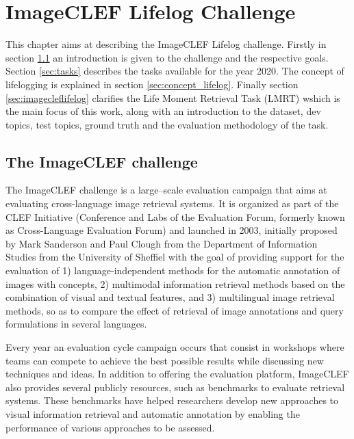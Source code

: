 \cleardoublepage

\chapter{ImageCLEF Lifelog Challenge}
\label{ch:imageclef}

This chapter aims at describing the ImageCLEF Lifelog challenge. Firstly in section \ref{sec:introduct} an introduction is given to the challenge and the respective goals. Section \ref{sec:tasks} describes the tasks available for the year 2020. The concept of lifelogging is explained in section \ref{sec:concept_lifelog}. Finally section \ref{sec:imagecleflifelog} clarifies the Life Moment Retrieval Task (LMRT) wshich is the main focus of this work, along with an introduction to the dataset, dev topics, test topics, ground truth and the evaluation methodology of the task.



\section{The ImageCLEF challenge}
\label{sec:introduct}

The ImageCLEF challenge is a large–scale evaluation campaign that aims at evaluating cross-language image retrieval systems. It is organized as part of the CLEF Initiative (Conference and Labs of the Evaluation Forum, formerly known as Cross-Language Evaluation Forum) and launched in  2003, initially proposed by Mark Sanderson and Paul Clough from the Department of Information Studies from the University of Sheffiel with the goal of providing support for the evaluation of 1) language-independent methods for the automatic annotation of images with concepts, 2) multimodal information retrieval methods based on the combination of visual and textual features, and 3) multilingual image retrieval methods, so as to compare the effect of retrieval of image annotations and query formulations in several languages.


Every year an evaluation cycle campaign occurs that consist in workshops where teams can compete to achieve the best possible results while discussing new techniques and ideas. In addition to offering the evaluation platform, ImageCLEF also provides several publicly resources, such as benchmarks to evaluate retrieval systems. These benchmarks have helped researchers develop new approaches to visual information retrieval and automatic annotation by enabling the performance of various approaches to be assessed.

